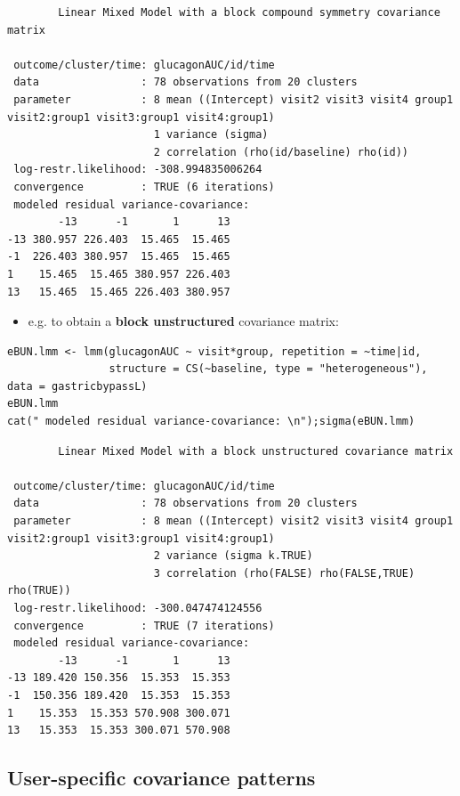 \documentclass[12pt]{article}
\begin{document}
\begin{verbatim}
		Linear Mixed Model with a block compound symmetry covariance matrix 

 outcome/cluster/time: glucagonAUC/id/time 
 data                : 78 observations from 20 clusters 
 parameter           : 8 mean ((Intercept) visit2 visit3 visit4 group1 visit2:group1 visit3:group1 visit4:group1) 
                       1 variance (sigma) 
                       2 correlation (rho(id/baseline) rho(id)) 
 log-restr.likelihood: -308.994835006264 
 convergence         : TRUE (6 iterations)
 modeled residual variance-covariance: 
        -13      -1       1      13
-13 380.957 226.403  15.465  15.465
-1  226.403 380.957  15.465  15.465
1    15.465  15.465 380.957 226.403
13   15.465  15.465 226.403 380.957
\end{verbatim}

\begin{itemize}
\item e.g. to obtain a \textbf{block unstructured} covariance matrix:
\end{itemize}
\lstset{language=r,label= ,caption= ,captionpos=b,numbers=none}
\begin{lstlisting}
eBUN.lmm <- lmm(glucagonAUC ~ visit*group, repetition = ~time|id,
                structure = CS(~baseline, type = "heterogeneous"), data = gastricbypassL)
eBUN.lmm
cat(" modeled residual variance-covariance: \n");sigma(eBUN.lmm)
\end{lstlisting}

\begin{verbatim}
		Linear Mixed Model with a block unstructured covariance matrix 

 outcome/cluster/time: glucagonAUC/id/time 
 data                : 78 observations from 20 clusters 
 parameter           : 8 mean ((Intercept) visit2 visit3 visit4 group1 visit2:group1 visit3:group1 visit4:group1) 
                       2 variance (sigma k.TRUE) 
                       3 correlation (rho(FALSE) rho(FALSE,TRUE) rho(TRUE)) 
 log-restr.likelihood: -300.047474124556 
 convergence         : TRUE (7 iterations)
 modeled residual variance-covariance: 
        -13      -1       1      13
-13 189.420 150.356  15.353  15.353
-1  150.356 189.420  15.353  15.353
1    15.353  15.353 570.908 300.071
13   15.353  15.353 300.071 570.908
\end{verbatim}

\clearpage

\subsection{User-specific covariance patterns}
\label{sec:orgddf0065}
\end{document}
